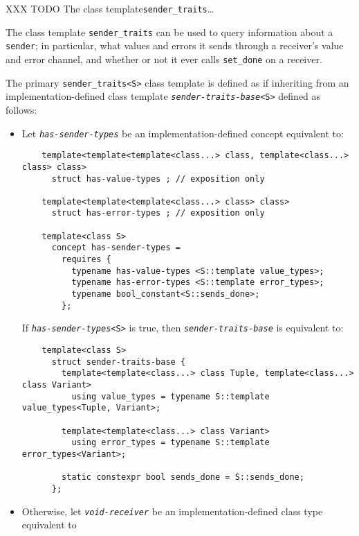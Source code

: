 \documentclass[a4paper,12pt,notitlepage,twoside,openright]{article}
\begin{document}
XXX TODO The class template\texttt{sender_traits}\ldots{}

The class template \texttt{sender_traits} can be used to
query information about a \texttt{sender}; in particular,
what values and errors it sends through a receiver's value and error
channel, and whether or not it ever calls \texttt{set_done}
on a receiver.

The primary \texttt{sender_traits<S>} class template is
defined as if inheriting from an implementation-defined class template
\emph{\texttt{sender-traits-base}}\texttt{<S>}
defined as follows:

\begin{itemize}
\item
  Let \emph{\texttt{has-sender-types}} be an
  implementation-defined concept equivalent to:

  \begin{verbatim}
    template<template<template<class...> class, template<class...> class> class>
      struct has-value-types ; // exposition only

    template<template<template<class...> class> class>
      struct has-error-types ; // exposition only

    template<class S>
      concept has-sender-types =
        requires {
          typename has-value-types <S::template value_types>;
          typename has-error-types <S::template error_types>;
          typename bool_constant<S::sends_done>;
        };
  \end{verbatim}

  If
  \emph{\texttt{has-sender-types}}\texttt{<S>}
  is true, then \emph{\texttt{sender-traits-base}} is
  equivalent to:

  \begin{verbatim}
    template<class S>
      struct sender-traits-base {
        template<template<class...> class Tuple, template<class...> class Variant>
          using value_types = typename S::template value_types<Tuple, Variant>;

        template<template<class...> class Variant>
          using error_types = typename S::template error_types<Variant>;

        static constexpr bool sends_done = S::sends_done;
      };
  \end{verbatim}
\item
  Otherwise, let \emph{\texttt{void-receiver}} be an
  implementation-defined class type equivalent to


\end{itemize}
\end{document}
